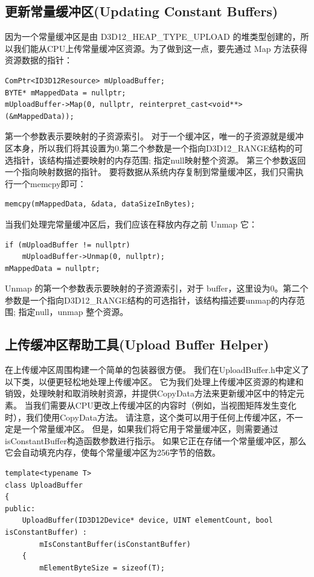 \documentclass[11pt,a4paper,oldfontcommands]{memoir}
\begin{document}
{\subsection{更新常量缓冲区(Updating Constant Buffers)}
\begin{flushleft}
因为一个常量缓冲区是由 D3D12\_HEAP\_TYPE\_UPLOAD 的堆类型创建的，所以我们能从CPU上传常量缓冲区资源。为了做到这一点，要先通过 Map 方法获得资源数据的指针：\\
\begin{lstlisting}
ComPtr<ID3D12Resource> mUploadBuffer;
BYTE* mMappedData = nullptr;
mUploadBuffer->Map(0, nullptr, reinterpret_cast<void**>(&mMappedData));
\end{lstlisting}
第一个参数表示要映射的子资源索引。 对于一个缓冲区，唯一的子资源就是缓冲区本身，所以我们将其设置为0.第二个参数是一个指向D3D12\_RANGE结构的可选指针，该结构描述要映射的内存范围; 指定null映射整个资源。 第三个参数返回一个指向映射数据的指针。 要将数据从系统内存复制到常量缓冲区，我们只需执行一个memcpy即可：\\
\begin{lstlisting}
memcpy(mMappedData, &data, dataSizeInBytes);
\end{lstlisting}
当我们处理完常量缓冲区后，我们应该在释放内存之前 Unmap 它：\\
\begin{lstlisting}
if (mUploadBuffer != nullptr)
    mUploadBuffer->Unmap(0, nullptr);
mMappedData = nullptr;
\end{lstlisting}
Unmap 的第一个参数表示要映射的子资源索引，对于 buffer，这里设为0。第二个参数是一个指向D3D12\_RANGE结构的可选指针，该结构描述要unmap的内存范围; 指定null，unmap 整个资源。
\end{flushleft}

\subsection{上传缓冲区帮助工具(Upload Buffer Helper)}
\begin{flushleft}
在上传缓冲区周围构建一个简单的包装器很方便。 我们在UploadBuffer.h中定义了以下类，以便更轻松地处理上传缓冲区。 它为我们处理上传缓冲区资源的构建和销毁，处理映射和取消映射资源，并提供CopyData方法来更新缓冲区中的特定元素。 当我们需要从CPU更改上传缓冲区的内容时（例如，当视图矩阵发生变化时），我们使用CopyData方法。 请注意，这个类可以用于任何上传缓冲区，不一定是一个常量缓冲区。 但是，如果我们将它用于常量缓冲区，则需要通过isConstantBuffer构造函数参数进行指示。 如果它正在存储一个常量缓冲区，那么它会自动填充内存，使每个常量缓冲区为256字节的倍数。
\end{flushleft}
\begin{lstlisting}
template<typename T>
class UploadBuffer
{
public:
    UploadBuffer(ID3D12Device* device, UINT elementCount, bool isConstantBuffer) : 
        mIsConstantBuffer(isConstantBuffer)
    {
        mElementByteSize = sizeof(T);


\end{lstlisting}}
\end{document}
